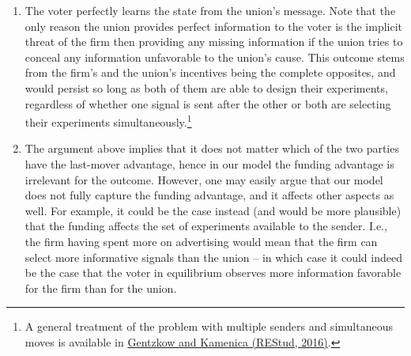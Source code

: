 \documentclass[a4paper]{article}
\begin{document}
\begin{enumerate}
	\item The voter perfectly learns the state from the union's message. Note that the only reason the union provides perfect information to the voter is the implicit threat of the firm then providing any missing information if the union tries to conceal any information unfavorable to the union's cause. This outcome stems from the firm's and the union's incentives being the complete opposites, and would persist so long as both of them are able to design their experiments, regardless of whether one signal is sent after the other or both are selecting their experiments simultaneously.\footnote{A general treatment of the problem with multiple senders and simultaneous moves is available in \href{https://doi.org/10.1093/restud/rdw052}{Gentzkow and Kamenica (REStud, 2016)}.}
	
	\item The argument above implies that it does not matter which of the two parties have the last-mover advantage, hence in our model the funding advantage is irrelevant for the outcome. However, one may easily argue that our model does not fully capture the funding advantage, and it affects other aspects as well. For example, it could be the case instead (and would be more plausible) that the funding affects the set of experiments available to the sender. I.e., the firm having spent more on advertising would mean that the firm can select more informative signals than the union -- in which case it could indeed be the case that the voter in equilibrium observes more information favorable for the firm than for the union.
\end{enumerate}
\fi
\end{document}
